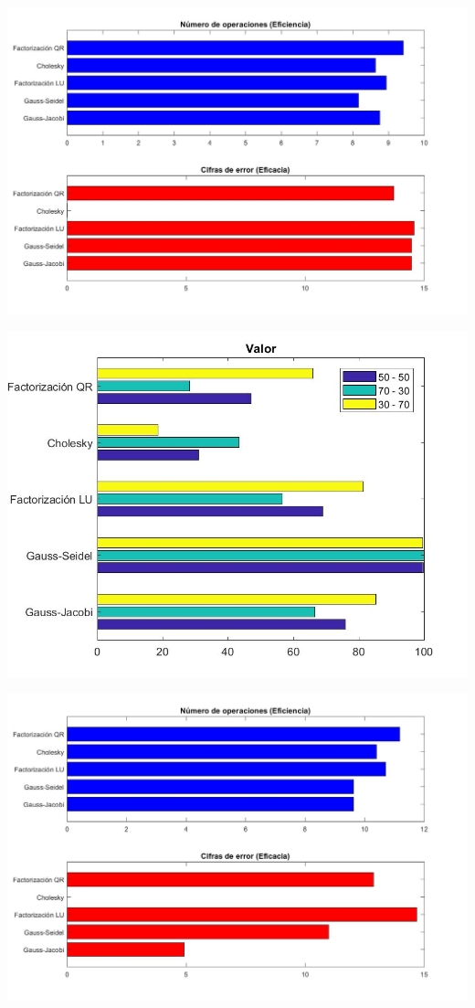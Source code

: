 \documentclass{memoria}
\begin{document}
{\includegraphics[width=15cm]{imagenes/SE/SE1089.jpg}}

{\includegraphics[width=15cm]{imagenes/SE/ranking1089.jpg}}

{\includegraphics[width=15cm]{imagenes/SE/SE4225.jpg}}
\end{document}
